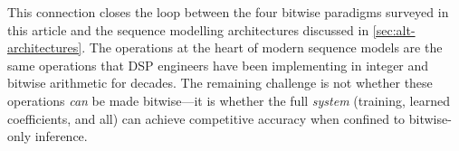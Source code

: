 This connection closes the loop between the four bitwise paradigms
surveyed in this article and the sequence modelling architectures
discussed in \cref{sec:alt-architectures}. The operations at the heart
of modern sequence models are the same operations that DSP engineers
have been implementing in integer and bitwise arithmetic for decades.
The remaining challenge is not whether these operations \emph{can} be
made bitwise---it is whether the full \emph{system} (training, learned
coefficients, and all) can achieve competitive accuracy when confined
to bitwise-only inference.
